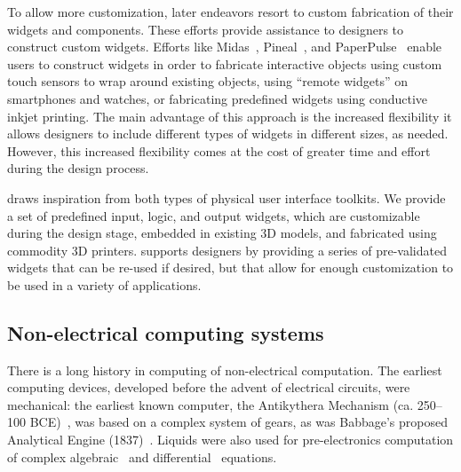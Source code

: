         To allow more customization, later endeavors resort to custom
        fabrication of their widgets and components. These efforts provide
        assistance to designers to construct custom widgets. Efforts like
        Midas~\cite{Savage:2012}, Pineal~\cite{Ledo:2017}, and
        PaperPulse~\cite{Ramakers:2015} enable users to construct widgets
        in order to fabricate interactive objects using custom touch
        sensors to wrap around existing objects, using ``remote widgets''
        on smartphones and watches, or fabricating predefined widgets using
        conductive inkjet printing. The main advantage of this approach is
        the increased flexibility it allows designers to
        include different types of widgets in different sizes,
        as needed. However, this increased flexibility comes at the cost of
        greater time and effort during the design process.

        \al draws inspiration from both types of physical user interface
        toolkits. We provide a set of predefined input, logic, and output
        widgets, which are customizable during the design stage, embedded
        in existing 3D models, and fabricated using commodity 3D printers.
        \al supports designers by providing a series of pre-validated
        widgets that can be re-used if desired, but that allow for enough
        customization to be used in a variety of applications.
        
      \subsection{Non-electrical computing systems}
        There is a long history in computing of non-electrical computation.
        The earliest computing devices, developed before the advent of
        electrical circuits, were mechanical: the earliest known
        computer, the Antikythera Mechanism (ca. 250--100
        BCE)~\cite{Efstathiou:2018}, was based on a complex system of
        gears, as was Babbage's proposed Analytical Engine
        (1837)~\cite{Bromley:1998}. Liquids were also used for
        pre-electronics computation of complex algebraic~\cite{Emch:1901}
        and differential~\cite{Moore:1936} equations.

